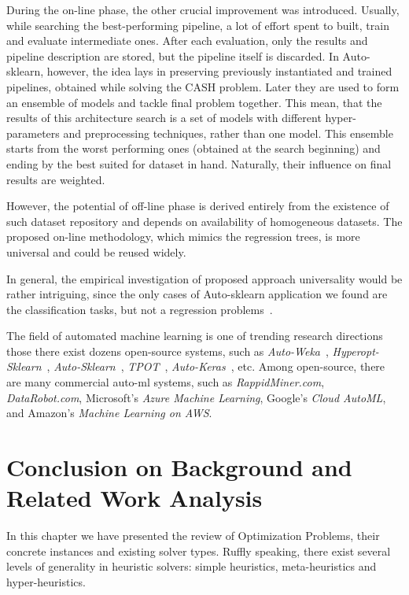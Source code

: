 During the on-line phase, the other crucial improvement was introduced. 
Usually, while searching the best-performing pipeline, a lot of effort spent to built, train and evaluate intermediate ones. After each evaluation, only the results and pipeline description are stored, but the pipeline itself is discarded. In Auto-sklearn, however, the idea lays in preserving previously instantiated and trained pipelines, obtained while solving the CASH problem. Later they are used to form an ensemble of models and tackle final problem together. This mean, that the results of this architecture search is a set of models with different hyper-parameters and preprocessing techniques, rather than one model. This ensemble starts from the worst performing ones (obtained at the search beginning) and ending by the best suited for dataset in hand. Naturally, their influence on final results are weighted.

However, the potential of off-line phase is derived entirely from the existence of such dataset repository and depends on availability of homogeneous datasets. The proposed on-line methodology, which mimics the regression trees, is more universal and could be reused widely.

In general, the empirical investigation of proposed approach universality would be rather intriguing, since the only cases of Auto-sklearn application we found are the classification tasks, but not a regression problems~\cite{feurer2015efficient,biedenkapp-ecai20}.


The field of automated machine learning is one of trending research directions those there exist dozens open-source systems, such as \textit{Auto-Weka}~\cite{thornton2013auto}, \textit{Hyperopt-Sklearn}~\cite{komer2014hyperopt}, \textit{Auto-Sklearn}~\cite{feurer2015efficient}, \textit{TPOT}~\cite{olson2019tpot}, \textit{Auto-Keras}~\cite{jin2019auto}, etc. Among open-source, there are many commercial auto-ml systems, such as \textit{RappidMiner.com}, \textit{DataRobot.com}, Microsoft’s \textit{Azure Machine Learning}, Google’s \textit{Cloud AutoML}, and Amazon's \textit{Machine Learning on AWS}.


\section{Conclusion on Background and Related Work Analysis}\label{bg: section conclusion}
In this chapter we have presented the review of Optimization Problems, their concrete instances and existing solver types.
Ruffly speaking, there exist several levels of generality in heuristic solvers: simple heuristics, meta-heuristics and hyper-heuristics.

